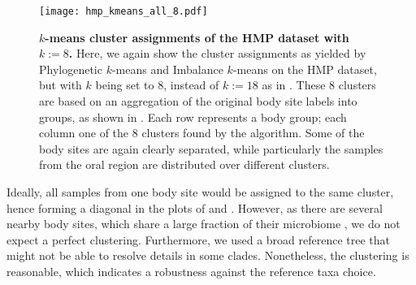 \begin{figure}[hpbt]
    \centering
    \texttt{[image: hmp\_kmeans\_all\_8.pdf]}
    \begin{subfigure}{0pt}
        \label{fig:hmp_kmeans_all_8:sub:em_unconstr}
    \end{subfigure}
    \begin{subfigure}{0pt}
        \label{fig:hmp_kmeans_all_8:sub:ei_unconstr}
    \end{subfigure}
    \caption[$k$-means cluster assignments of the \acs{HMP} dataset with $k:=8$]{
        \textbf{$k$-means cluster assignments of the \acs{HMP} dataset with $k:=8$.}
        Here, we again show the cluster assignments as yielded by
         Phylogenetic $k$-means and
         Imbalance $k$-means on the \ac{HMP} dataset,
        but with $k$ being set to 8, instead of $k:=18$ as in .
        These \num{8} clusters are based on an aggregation of the original body site labels into groups,
        as shown in .
        Each row represents a body group; each column one of the \num{8} clusters found by the algorithm.
        Some of the body sites are again clearly separated,
        while particularly the samples from the oral region are distributed over different clusters.
    }
    \label{fig:hmp_kmeans_all_8}
\end{figure}

Ideally, all samples from one body site would be assigned to the same cluster,
hence forming a diagonal in the plots of  and .
However, as there are several nearby body sites, which share a large fraction of their microbiome \cite{Huttenhower2012},
we do not expect a perfect clustering.
Furthermore, we used a broad reference tree that might not be able to resolve details in some clades.
Nonetheless, the clustering is reasonable, which indicates a robustness against the reference taxa choice.


